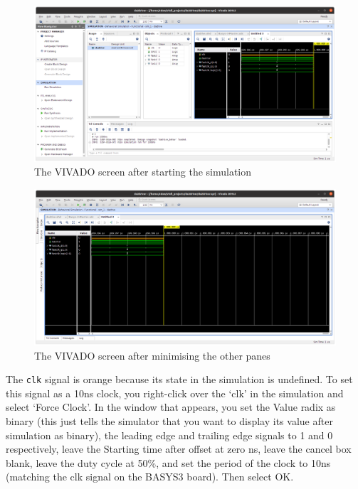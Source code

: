 \documentclass[../physical_computing.tex]{subfiles}
\begin{document}
\begin{figure}[htbp]
    \centering
    \includegraphics[width=1.0\textwidth]{figures/vivado_aftersimstart.png}
    \caption{The VIVADO screen after starting the simulation}
    \label{fig:vivdac1}
\end{figure}
\begin{figure}[htbp]
    \centering
    \includegraphics[width=1.0\textwidth]{figures/vivdac2.png}
    \caption{The VIVADO screen after minimising the other panes}
    \label{fig:vivdac2}
\end{figure}

The \texttt{clk} signal is orange because its state in the simulation is undefined. To set this signal as a 10ns clock, you right-click over the `clk' in the simulation and select `Force Clock'. In the window that appears, you set the Value radix as binary (this just tells the simulator that you want to display its value after simulation as binary), the leading edge and trailing edge signals to 1 and 0 respectively, leave the Starting time after offset at zero ns, leave the cancel box blank, leave the duty cycle at 50\%, and set the period of the clock to 10ns (matching the clk signal on the BASYS3 board). Then select OK. 
\end{document}
